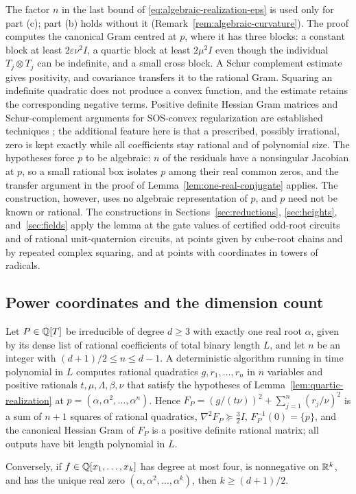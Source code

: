 The factor $n$ in the last bound of \eqref{eq:algebraic-realization-eps} is
used only for part (c); part (b) holds without it
(Remark~\ref{rem:algebraic-curvature}). The proof computes the
canonical Gram centred at $p$, where it has three blocks: a constant block at
least $2\varepsilon\nu^2I$, a quartic block at least $2\mu^2I$ even though the
individual $T_j\otimes T_j$ can be indefinite, and a small cross block. A
Schur complement estimate gives positivity, and covariance transfers it to the
rational Gram. Squaring an indefinite quadratic does not produce a convex
function, and the estimate retains the corresponding negative terms. Positive
definite Hessian Gram matrices and Schur-complement arguments for SOS-convex
regularization are established techniques \cite{AhmadiChaudhryZhang2024}; the
additional feature here is that a prescribed, possibly irrational, zero is kept
exactly while all coefficients stay rational and of polynomial size. The
hypotheses force $p$ to be algebraic: $n$ of the residuals have a nonsingular
Jacobian at $p$, so a small rational box isolates $p$ among their real common
zeros, and the transfer argument in the proof of
Lemma~\ref{lem:one-real-conjugate} applies. The construction, however, uses
no algebraic representation of $p$, and $p$ need not be known or rational.
The constructions in Sections~\ref{sec:reductions}, \ref{sec:heights},
and~\ref{sec:fields} apply the lemma at the gate values of certified odd-root
circuits and of rational unit-quaternion circuits, at points given by
cube-root chains and by repeated complex squaring, and at points with
coordinates in towers of radicals.

\subsection{Power coordinates and the dimension count}
\label{sec:algebraic-power}

\begin{theorem}
\label{thm:algebraic-dimension}
Let $P\in\mathbb Q[T]$ be irreducible of degree $d\ge3$ with exactly one real root
$\alpha$, given by its dense list of rational coefficients of total binary
length $L$, and let $n$ be an integer with $(d+1)/2\le n\le d-1$. A
deterministic algorithm running in time polynomial in $L$ computes rational
quadratics $g,r_1,\ldots,r_n$ in $n$ variables and positive rationals
$t,\mu,\Lambda,\beta,\nu$ that satisfy the hypotheses of
Lemma~\ref{lem:quartic-realization} at $p=(\alpha,\alpha^2,\ldots,\alpha^n)$. Hence
$F_P=(g/(t\nu))^2+\sum_{j=1}^n(r_j/\nu)^2$ is a sum of $n+1$ squares of
rational quadratics, $\nabla^2F_P\succeq\tfrac32I$, $F_P^{-1}(0)=\{p\}$, and
the canonical Hessian Gram of $F_P$ is a positive definite rational matrix; all
outputs have bit length polynomial in $L$.

Conversely, if $f\in\mathbb Q[x_1,\ldots,x_k]$ has degree at most four, is
nonnegative on $\mathbb R^k$, and has the unique real zero
$(\alpha,\alpha^2,\ldots,\alpha^k)$, then $k\ge(d+1)/2$.
\end{theorem}


